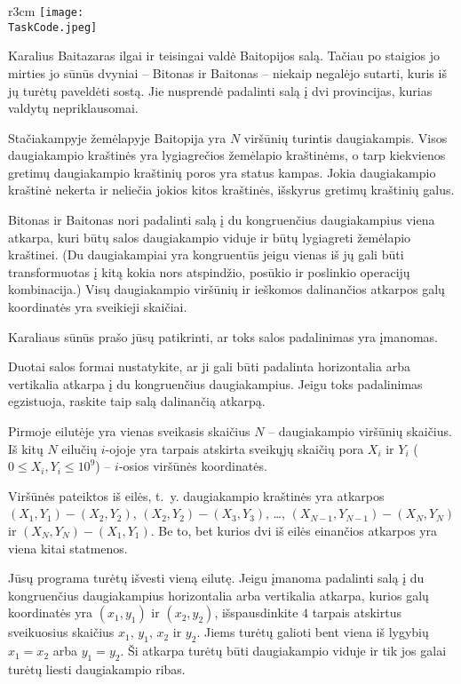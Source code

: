 \documentclass{boi2014-lt}
\renewcommand{\TaskCode}{demarcation}
\begin{document}
    \begin{wrapfigure}{r}{3cm}
        \vspace{-24pt}
        \texttt{[image: \\TaskCode.jpeg]}
    \end{wrapfigure}

    Karalius Baitazaras ilgai ir teisingai valdė Baitopijos salą. Tačiau po
    staigios jo mirties jo sūnūs dvyniai -- Bitonas ir Baitonas -- niekaip
    negalėjo sutarti, kuris iš jų turėtų paveldėti sostą. Jie nusprendė
    padalinti salą į dvi provincijas, kurias valdytų nepriklausomai.
 
    Stačiakampyje žemėlapyje Baitopija yra $N$ viršūnių turintis daugiakampis.
    Visos daugiakampio kraštinės yra lygiagrečios žemėlapio kraštinėms, o
    tarp kiekvienos gretimų daugiakampio kraštinių poros yra status kampas. Jokia
    daugiakampio kraštinė nekerta ir neliečia jokios kitos kraštinės, išskyrus
    gretimų kraštinių galus.

    Bitonas ir Baitonas nori padalinti salą į du kongruenčius daugiakampius
    viena atkarpa, kuri būtų salos daugiakampio viduje ir būtų lygiagreti
    žemėlapio kraštinei. (Du daugiakampiai yra kongruentūs jeigu vienas iš jų
    gali būti transformuotas į kitą kokia nors atspindžio, posūkio ir poslinkio
    operacijų kombinacija.) Visų daugiakampio viršūnių ir ieškomos dalinančios
    atkarpos galų koordinatės yra sveikieji skaičiai.
 
    Karaliaus sūnūs prašo jūsų patikrinti, ar toks salos padalinimas yra
    įmanomas.

    \Task
    Duotai salos formai nustatykite, ar ji gali būti padalinta horizontalia arba
    vertikalia atkarpa į du kongruenčius daugiakampius. Jeigu toks padalinimas
    egzistuoja, raskite taip salą dalinančią atkarpą.

    \Input
    Pirmoje eilutėje yra vienas sveikasis skaičius $N$ -- daugiakampio viršūnių
    skaičius. Iš kitų $N$ eilučių $i$-ojoje yra tarpais atskirta sveikųjų
    skaičių pora $X_i$ ir $Y_i$ ($0 \le X_i, Y_i \le 10^9$) -- $i$-osios
    viršūnės koordinatės.
    
    Viršūnės pateiktos iš eilės, t.~y. daugiakampio kraštinės yra atkarpos
    $(X_1,Y_1) - (X_2,Y_2)$, $(X_2,Y_2) - (X_3,Y_3)$, \ldots,
    $(X_{N-1},Y_{N-1}) - (X_N,Y_N)$ ir $(X_N,Y_N) - (X_1,Y_1)$. Be to, bet
    kurios dvi iš eilės einančios atkarpos yra viena kitai statmenos.

    \Output
    Jūsų programa turėtų išvesti vieną eilutę. Jeigu įmanoma padalinti salą į du
    kongruenčius daugiakampius horizontalia arba vertikalia atkarpa, kurios galų
    koordinatės yra $(x_1, y_1)$ ir $(x_2, y_2)$, išspausdinkite $4$ tarpais
    atskirtus sveikuosius skaičius $x_1$, $y_1$, $x_2$ ir $y_2$. Jiems turėtų
    galioti bent viena iš lygybių $x_1 = x_2$ arba $y_1 = y_2$. Ši atkarpa
    turėtų būti daugiakampio viduje ir tik jos galai turėtų liesti daugiakampio
    ribas.
\end{document}
